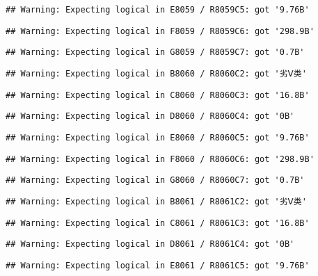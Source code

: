 \documentclass[
]{article}
\begin{document}
\begin{verbatim}
## Warning: Expecting logical in E8059 / R8059C5: got '9.76B'
\end{verbatim}

\begin{verbatim}
## Warning: Expecting logical in F8059 / R8059C6: got '298.9B'
\end{verbatim}

\begin{verbatim}
## Warning: Expecting logical in G8059 / R8059C7: got '0.7B'
\end{verbatim}

\begin{verbatim}
## Warning: Expecting logical in B8060 / R8060C2: got '劣Ⅴ类'
\end{verbatim}

\begin{verbatim}
## Warning: Expecting logical in C8060 / R8060C3: got '16.8B'
\end{verbatim}

\begin{verbatim}
## Warning: Expecting logical in D8060 / R8060C4: got '0B'
\end{verbatim}

\begin{verbatim}
## Warning: Expecting logical in E8060 / R8060C5: got '9.76B'
\end{verbatim}

\begin{verbatim}
## Warning: Expecting logical in F8060 / R8060C6: got '298.9B'
\end{verbatim}

\begin{verbatim}
## Warning: Expecting logical in G8060 / R8060C7: got '0.7B'
\end{verbatim}

\begin{verbatim}
## Warning: Expecting logical in B8061 / R8061C2: got '劣Ⅴ类'
\end{verbatim}

\begin{verbatim}
## Warning: Expecting logical in C8061 / R8061C3: got '16.8B'
\end{verbatim}

\begin{verbatim}
## Warning: Expecting logical in D8061 / R8061C4: got '0B'
\end{verbatim}

\begin{verbatim}
## Warning: Expecting logical in E8061 / R8061C5: got '9.76B'
\end{verbatim}
\end{document}
